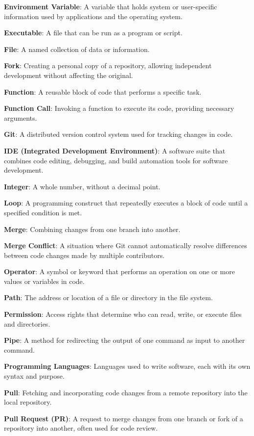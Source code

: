 \documentclass[9pt]{cheatsheet}
\begin{document}
\begin{multicols*}{3}
\textbf{Environment Variable}: A variable that holds system or user-specific information used by applications and the operating system.

\textbf{Executable}: A file that can be run as a program or script.

\textbf{File}: A named collection of data or information.

\textbf{Fork}: Creating a personal copy of a repository, allowing independent development without affecting the original.

\textbf{Function}: A reusable block of code that performs a specific task.

\textbf{Function Call}: Invoking a function to execute its code, providing necessary arguments.

\textbf{Git}: A distributed version control system used for tracking changes in code.

\textbf{IDE (Integrated Development Environment)}: A software suite that combines code editing, debugging, and build automation tools for software development.

\textbf{Integer}: A whole number, without a decimal point.

\textbf{Loop}: A programming construct that repeatedly executes a block of code until a specified condition is met.

\textbf{Merge}: Combining changes from one branch into another.

\textbf{Merge Conflict}: A situation where Git cannot automatically resolve differences between code changes made by multiple contributors.

\textbf{Operator}: A symbol or keyword that performs an operation on one or more values or variables in code.

\textbf{Path}: The address or location of a file or directory in the file system.

\textbf{Permission}: Access rights that determine who can read, write, or execute files and directories.

\textbf{Pipe}: A method for redirecting the output of one command as input to another command.

\textbf{Programming Languages}: Languages used to write software, each with its own syntax and purpose.

\textbf{Pull}: Fetching and incorporating code changes from a remote repository into the local repository.

\textbf{Pull Request (PR)}: A request to merge changes from one branch or fork of a repository into another, often used for code review.


\end{multicols*}
\end{document}
